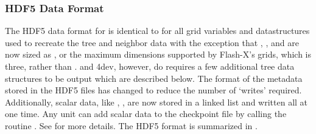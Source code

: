 \subsubsection{HDF5 Data Format}\label{Sec:Data Format}
The HDF5 data format for \flashx is identical to \flashx for all
grid variables and datastructures used to recreate the tree and
neighbor data with the exception that , , and 
are now sized as , or the maximum dimensions supported by Flash-X's 
grids, which is three, rather than .
 and \Paramesh4dev, however, do requires a few additional tree data structures
to be output which are described below.  The format of the metadata stored in the HDF5 files
has changed to reduce the number of `writes' required. Additionally,
scalar data, like , \etc, are now stored in a
linked list and written all at one time.  Any unit can add scalar
data to the checkpoint file by calling the routine
.  See
 for more details.  The \flashx HDF5 format is
summarized in .


